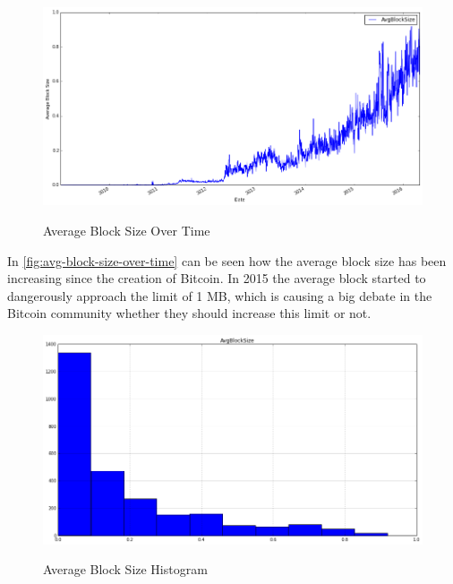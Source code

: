 \begin{figure}[bth]
  \myfloatalign
  {\includegraphics[width=1\linewidth]
    {gfx/avg-block-size-over-time}} 
  \caption{Average Block Size Over Time}
  \label{fig:avg-block-size-over-time}
\end{figure}

In \autoref{fig:avg-block-size-over-time} can be seen how the average
block size has been increasing since the creation of Bitcoin. In 2015
the average block started to dangerously approach the limit of 1 MB,
which is causing a big debate in the Bitcoin community whether they
should increase this limit or not.

\begin{figure}[bth]
  \myfloatalign
  {\includegraphics[width=1\linewidth]
    {gfx/avg-block-size-histogram}} 
  \caption{Average Block Size Histogram}
  \label{fig:avg-block-size-histogram}
\end{figure}

